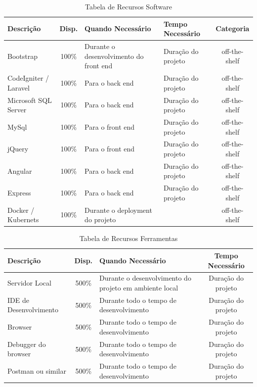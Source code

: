 \documentclass[a4paper]{report}
\begin{document}
\begin{table}[]
\centering
\begin{tabularx}{\textwidth}{X|c|X|X|c}
\textbf{Descrição} & \textbf{Disp.} & \textbf{Quando Necessário} & \textbf{Tempo Necessário} & \textbf{Categoria} \\ \hline
Bootstrap & \multicolumn{1}{c|}{100\%} & Durante o desenvolvimento do front end & Duração do projeto & off-the-shelf \\ \hline
CodeIgniter / Laravel & 100\% & Para o back end & Duração do projeto & off-the-shelf \\ \hline
Microsoft SQL Server & \multicolumn{1}{c|}{100\%} & Para o back end & Duração do projeto & off-the-shelf \\ \hline
MySql & 100\% & Para o front end & Duração do projeto & off-the-shelf \\ \hline
jQuery & 100\% & Para o front end & Duração do projeto & off-the-shelf \\ \hline
Angular & 100\% & Para o back end & Duração do projeto & off-the-shelf \\ \hline
Express & 100\% & Para o back end & Duração do projeto & off-the-shelf \\ \hline
Docker / Kubernets & \multicolumn{1}{c|}{100\%} & Durante o deployment do projeto &  & off-the-shelf \\
\end{tabularx}
\caption{Tabela de Recursos Software}
\label{TabRS}
\end{table}
\begin{table}[]
\centering
\begin{tabularx}{\textwidth}{l|c|X|c}
\textbf{Descrição} & \textbf{Disp.} & \textbf{Quando Necessário} & \textbf{Tempo Necessário} \\ \hline
Servidor Local & 500\% & Durante o desenvolvimento do projeto em ambiente local &  Duração do projeto\\ \hline
IDE de Desenvolvimento & 500\% & Durante todo o tempo de desenvolvimento &  Duração do projeto \\ \hline
Browser & 500\% & Durante todo o tempo de desenvolvimento &  Duração do projeto\\ \hline
Debugger do browser & 500\% & Durante todo o tempo de desenvolvimento & Duração do projeto  \\ \hline
Postman ou similar & 500\% & Durante todo o tempo de desenvolvimento & Duração do projeto \\
\end{tabularx}
\caption{Tabela de Recursos Ferramentas}
\label{TabF}
\end{table}
\end{document}
